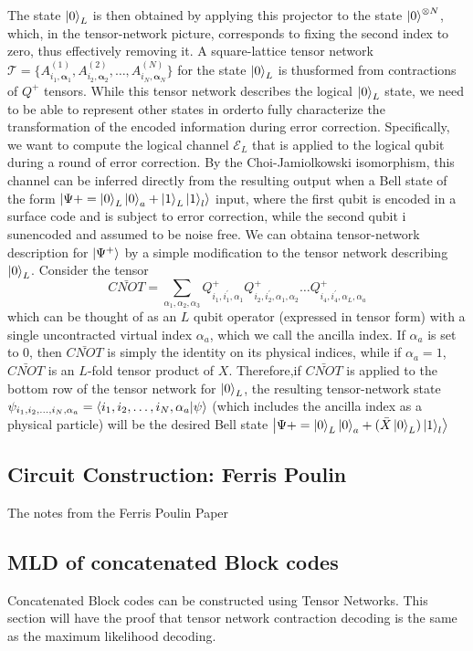 The state \(\ket{0}_L\) is then obtained by applying this projector to the state \(\ket{0}^{\otimes N}\), which, in the tensor-network picture, corresponds to fixing the second index to zero, thus effectively removing it. A square-lattice tensor network \(\mathcal{T} = \{A_{i_1, \mathbf{\alpha}_1}^{(1)}, A_{i_2, \mathbf{\alpha}_2}^{(2)},\dots, A_{i_N, \mathbf{\alpha}_N}^{(N)} \}\) for the state \(\ket{0}_L\) is thusformed from contractions of \(Q^+\) tensors.
While this tensor network describes the logical \(\ket{0}_L\) state, we need to be able to represent other states in orderto fully characterize the transformation of the encoded information during error correction. Specifically, we want to compute the logical channel \(\mathcal{E}_L\) that is applied to the logical qubit during a round of error correction. By the Choi-Jamiolkowski isomorphism, this channel can be inferred directly from the resulting output when a Bell state of the form \(\ket{\Psi{+} = \ket{0}_L \ket{0}_a + \ket{1}_L \ket{1}_l}\) input, where the first qubit is encoded in a surface code and is subject to error correction, while the second qubit i sunencoded and assumed to be noise free. We can obtaina tensor-network description for \(\ket{\Psi^+}\) by a simple modification to the tensor network describing \(\ket{0}_L\). Consider the tensor
\begin{equation*}
    \bar{CNOT} = \sum_{\alpha_1, \alpha_2, \alpha_3} Q^{+}_{i_1, i_1^{'},\alpha_1} Q^{+}_{i_2, i_2^{'},\alpha_1, \alpha_2}  \dots Q^{+}_{i_4, i_4^{'},\alpha_L, \alpha_a}
\end{equation*}
which can be thought of as an \(L\) qubit operator (expressed in tensor form) with a single uncontracted virtual index \(\alpha_a\), which we call the ancilla index. If \(\alpha_a\) is set to 0, then \(\bar{CNOT}\) is simply the identity on its physical indices, while if \(\alpha_a =1\), \(\bar{CNOT}\) is an \(L\)-fold tensor product of \(X\). Therefore,if \(\bar{CNOT}\) is applied to the bottom row of the tensor network for \(\ket{0}_L\), the resulting tensor-network state \(\psi_{i_1, i_2,\dots,i_N, \alpha_a} = \braket{i_1, i_2,\dots,i_N, \alpha_a}{\psi}\) (which includes the ancilla index as a physical particle) will be the desired Bell state \(\ket{\Psi{+} = \ket{0}_L \ket{0}_a + (\bar{X}\ket{0}_L) \ket{1}_l}\)


\subsection{Circuit Construction: Ferris Poulin}
The notes from the Ferris Poulin Paper


\subsection{MLD of concatenated Block codes}
Concatenated Block codes can be constructed using Tensor Networks. This section will have the proof that tensor network contraction decoding is the same as the maximum likelihood decoding.